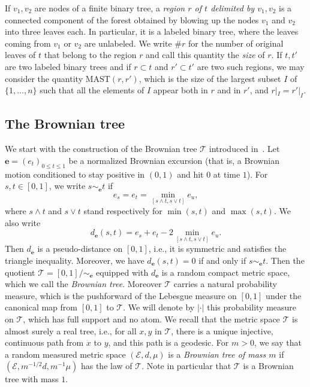 \documentclass[11pt]{article}
\newcommand{\ie}{i.e.,\xspace}
\newcommand{\bme}{\mathbf{e}}
\newcommand{\MAST}{\mathrm{MAST}}
\newcommand{\Tt}{\mathcal{T}}
\theoremstyle{plain}
\theoremstyle{definition}
\numberwithin{equation}{section}
\begin{document}
If $v_1, v_2$ are nodes of a finite binary tree, a \emph{region $r$ of $t$ delimited by $v_1, v_2$} is a connected component of the forest obtained by blowing up the nodes $v_1$ and $v_2$ into three leaves each. In particular, it is a labeled binary tree, where the leaves coming from $v_1$ or $v_2$ are unlabeled.
We write $\# r$ for the number of original leaves of $t$ that belong to the region $r$ and call this quantity the \emph{size} of $r$.
If $t,t'$ are two labeled binary trees and if $r \subset t$ and $r' \subset t'$ are two such regions, we may consider the quantity $\MAST(r,r')$, which is the size of the largest subset $I$ of $\{1,\dots,n\}$ such that all the elements of $I$ appear both in $r$ and in $r'$, and $r|_I=r'|_I$.

\subsection{The Brownian tree}\label{subsec:BCRT}

We start with the construction of the Brownian tree $\Tt$ introduced in~\cite{Ald91, Ald93}. Let $\mathbf{e}=(e_t)_{0 \leq t \leq 1}$ be a normalized Brownian excursion (that is, a Brownian motion conditioned to stay positive in $(0,1)$ and hit $0$ at time $1$). For $s,t \in [0,1]$, we write $s \sim_{\bme} t$ if\vspace*{-3pt}
\[ e_s=e_t=\min_{[s \wedge t, s \vee t]} e_u,\]
where $s \wedge t$ and $s \vee t$ stand respectively for $\min(s,t)$ and $\max(s,t)$.
We also write\vspace*{-3pt}
\[ d_{\bme}(s,t)=e_s+e_t-2 \min_{[s \wedge t, s \vee t]} e_u. \]
Then $d_{\bme}$ is a pseudo-distance on $[0,1]$, \ie it is symmetric and satisfies the triangle inequality. Moreover, we have $d_{\bme}(s,t)=0$ if and only if $s \sim_{\bme} t$.
Then the quotient $\Tt=[0,1] / \sim_{\bme}$ equipped with $d_{\bme}$ is a random compact metric space, which we call the \emph{Brownian tree}.
Moreover $\Tt$ carries a natural probability measure, which is the pushforward of the Lebesgue measure on $[0,1]$ under the canonical map from $[0,1]$ to $\Tt$.
We will denote by $|\cdot |$ this probability measure on $\Tt$, which has full support and no atom.
We recall that the metric space $\Tt$ is almost surely a real tree, \ie for all $x,y$ in $\Tt$, there is a unique injective, continuous path from $x$ to $y$, and this path is a geodesic.
For $m>0$, we say that a random measured metric space $(\mathcal{E},d,\mu)$ is a \emph{Brownian tree of mass $m$} if $(\mathcal{E}, m^{-1/2}d, m^{-1}\mu)$ has the law of $\Tt$.
Note in particular that $\Tt$ is a Brownian tree with mass $1$.
\end{document}

